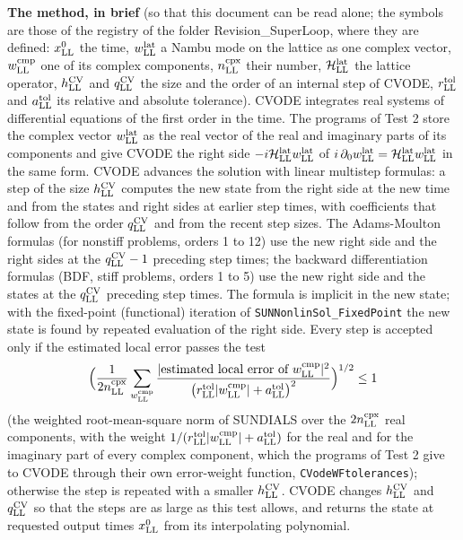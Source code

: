 \documentclass[
  10pt,
]{article}
\begin{document}
\textbf{The method, in brief} (so that this document can be read alone;
the symbols are those of the registry of the folder Revision\_SuperLoop,
where they are defined: \(x^0_{\rm LL}\) the time,
\(w^{\rm lat}_{\rm LL}\) a Nambu mode on the lattice as one complex
vector, \(w^{\rm cmp}_{\rm LL}\) one of its complex components,
\(n^{\rm cpx}_{\rm LL}\) their number, \(\mathcal H^{\rm lat}_{\rm LL}\)
the lattice operator, \(h^{\rm CV}_{\rm LL}\) and
\(q^{\rm CV}_{\rm LL}\) the size and the order of an internal step of
CVODE, \(r^{\rm tol}_{\rm LL}\) and \(a^{\rm tol}_{\rm LL}\) its
relative and absolute tolerance). CVODE integrates real systems of
differential equations of the first order in the time. The programs of
Test 2 store the complex vector \(w^{\rm lat}_{\rm LL}\) as the real
vector of the real and imaginary parts of its components and give CVODE
the right side \(-i\mathcal H^{\rm lat}_{\rm LL}w^{\rm lat}_{\rm LL}\)
of
\(i\,\partial_0w^{\rm lat}_{\rm LL}=\mathcal H^{\rm lat}_{\rm LL}w^{\rm lat}_{\rm LL}\)
in the same form. CVODE advances the solution with linear multistep
formulas: a step of the size \(h^{\rm CV}_{\rm LL}\) computes the new
state from the right side at the new time and from the states and right
sides at earlier step times, with coefficients that follow from the
order \(q^{\rm CV}_{\rm LL}\) and from the recent step sizes. The
Adams-Moulton formulas (for nonstiff problems, orders 1 to 12) use the
new right side and the right sides at the \(q^{\rm CV}_{\rm LL}-1\)
preceding step times; the backward differentiation formulas (BDF, stiff
problems, orders 1 to 5) use the new right side and the states at the
\(q^{\rm CV}_{\rm LL}\) preceding step times. The formula is implicit in
the new state; with the fixed-point (functional) iteration of
\texttt{SUNNonlinSol\_FixedPoint} the new state is found by repeated
evaluation of the right side. Every step is accepted only if the
estimated local error passes the test
\[\Big(\frac{1}{2n^{\rm cpx}_{\rm LL}}\sum_{w^{\rm cmp}_{\rm LL}}\frac{\lvert\text{estimated local error of }w^{\rm cmp}_{\rm LL}\rvert^2}{\big(r^{\rm tol}_{\rm LL}\lvert w^{\rm cmp}_{\rm LL}\rvert+a^{\rm tol}_{\rm LL}\big)^2}\Big)^{1/2}\le1\]
(the weighted root-mean-square norm of SUNDIALS over the
\(2n^{\rm cpx}_{\rm LL}\) real components, with the weight
\(1/(r^{\rm tol}_{\rm LL}\lvert w^{\rm cmp}_{\rm LL}\rvert+a^{\rm tol}_{\rm LL})\)
for the real and for the imaginary part of every complex component,
which the programs of Test 2 give to CVODE through their own
error-weight function, \texttt{CVodeWFtolerances}); otherwise the step
is repeated with a smaller \(h^{\rm CV}_{\rm LL}\). CVODE changes
\(h^{\rm CV}_{\rm LL}\) and \(q^{\rm CV}_{\rm LL}\) so that the steps
are as large as this test allows, and returns the state at requested
output times \(x^0_{\rm LL}\) from its interpolating polynomial.
\end{document}
